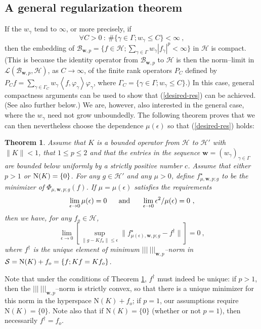 \documentclass[10pt]{article}
\newtheorem{theorem}{Theorem}[section]
\def\cH{\mathcal{H}}
\def\mN{\mbox{N}}
\def\fs{f^{\dagger}}
\def\ag{w_{\gamma}}
\def\g{\gamma}
\newcommand\eref[1]{(\ref{#1})}
\def\Vvert{\vert\!\vert\!\vert}
\begin{document}
\subsection {A general regularization theorem}
If the $\ag$ tend to $\infty$, or more precisely, if
\begin{equation}
\label{compact-emb}
\forall C >0 ~: ~ \# \{ \g \in \Gamma ; \ag \leq C \} < \infty ~,
\end{equation}
then the embedding of $\mathcal{B}_{\mathbf{w},p}=
\{ f \in \cH;\sum_{\g \in \Gamma} \ag |f_\g|^p < \infty \}$ in $\cH$ is
compact. (This is because the identity operator from
$\mathcal{B}_{\mathbf{w},p}$ to
$\cH$ is then the norm--limit in $\mathcal{L}(\mathcal{B}_{\mathbf{w},p},
\cH)$,
as $C \to \infty$,
of the finite rank operators $P_C$ defined by
$P_C f=\sum_{\g \in \Gamma_C} \ag \left<f,\varphi_\g \right> \varphi_\g$,
where $\Gamma_C= \{ \g \in \Gamma ; \ag \leq C \}$.) In this case,
general compactness arguments can be used to show that \eref{desired-res}
can be achieved. (See also further below.)
We are, however, also interested in the general case, where
the $\ag$ need not grow unboundedly.
The following theorem proves that we can then nevertheless
choose the dependence $\mu(\epsilon)$
so that \eref{desired-res} holds:
\begin{theorem}
\label{regthm}
Assume that $K$ is a bounded operator from $\cH$ to $\cH'$ with $\|K\|<1$, that
$1 \leq p \leq 2$ and that the entries in the sequence
$\mathbf{w}=(\ag)_{\g \in \Gamma}$
are bounded below uniformly by a strictly positive number $c$.
Assume that either $p>1$ or $\mbox{{\rm N}}(K)=\{0\}$.
For any $g \in \cH'$
and any $\mu >0$, define
$f^{\star}_{\mu, \mathbf{w},p;g}$ to be the minimizer of $\Phi_{\mu,
\mathbf{w},p ; g}(f)$.
If $\mu=\mu(\epsilon)$ satisfies the requirements
\begin{equation}
\label{mu-req}
\lim_{\epsilon \rightarrow 0} \mu(\epsilon)=0 ~~~~~ \mbox{{\rm and}}
~~~~~ \lim_{\epsilon \rightarrow 0} \epsilon^2/\mu(\epsilon) =0 ~,
\end{equation}
then we have, for any $f_o \in \cH$,
$$
\lim_{\epsilon \rightarrow 0} \left[ \sup_{\|g-Kf_o\|\leq \epsilon}
\|f^{\star}_{\mu(\epsilon), \mathbf{w},p;g}-\fs \|\right] =0 ~,
$$
where $\fs$ is the unique element of minimum
$\Vvert ~ \Vvert _{\mathbf{w},p}$--norm in $\mathcal{S}
= \mbox{{\rm N}}(K)+f_o =
\{f; Kf = Kf_o\}$.
\end{theorem}


Note that under the conditions of Theorem \ref{regthm}, $\fs$ must indeed
be unique:
if $p>1$, then the $\Vvert ~ \Vvert _{\mathbf{w},p}$--norm is strictly
convex, so
that there is a unique minimizer for this norm in the hyperspace $\mN(K)+f_o$;
if $p=1$, our assumptions require $\mN(K)=\{0\}$. Note also that
if $\mN(K)=\{0\}$ (whether or not $p=1$), then necessarily $\fs = f_o$.
\end{document}

